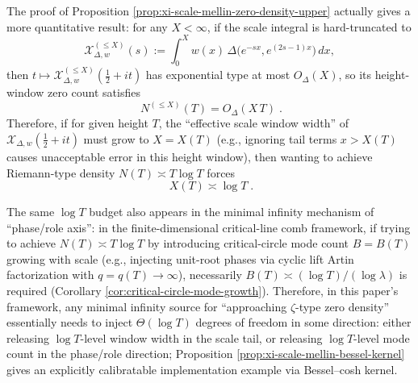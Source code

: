 \begin{remark}\label{rem:xi-scale-mellin-logT-budget}
The proof of Proposition \ref{prop:xi-scale-mellin-zero-density-upper} actually gives a more quantitative result: for any \(X<\infty\), if the scale integral is hard-truncated to
\[
\mathcal X_{\Delta,w}^{(\le X)}(s):=\int_{0}^{X} w(x)\,\Delta\!\bigl(e^{-sx},e^{(2s-1)x}\bigr)\,dx,
\]
then \(t\mapsto \mathcal X_{\Delta,w}^{(\le X)}(\tfrac12+it)\) has exponential type at most \(O_\Delta(X)\), so its height-window zero count satisfies
\[
\boxed{\;N^{(\le X)}(T)=O_\Delta(X\,T)\; }.
\]
Therefore, if for given height \(T\), the ``effective scale window width'' of \(\mathcal X_{\Delta,w}(\tfrac12+it)\) must grow to \(X=X(T)\) (e.g., ignoring tail terms \(x>X(T)\) causes unacceptable error in this height window), then wanting to achieve Riemann-type density \(N(T)\asymp T\log T\) forces
\[
\boxed{\;X(T)\asymp \log T\; }.
\]
\par
The same \(\log T\) budget also appears in the minimal infinity mechanism of ``phase/role axis'': in the finite-dimensional critical-line comb framework, if trying to achieve \(N(T)\asymp T\log T\) by introducing critical-circle mode count \(B=B(T)\) growing with scale (e.g., injecting unit-root phases via cyclic lift Artin factorization with \(q=q(T)\to\infty\)), necessarily \(B(T)\asymp (\log T)/(\log\lambda)\) is required (Corollary \ref{cor:critical-circle-mode-growth}).
Therefore, in this paper's framework, any minimal infinity source for ``approaching \(\zeta\)-type zero density'' essentially needs to inject \(\Theta(\log T)\) degrees of freedom in some direction: either releasing \(\log T\)-level window width in the scale tail, or releasing \(\log T\)-level mode count in the phase/role direction; Proposition \ref{prop:xi-scale-mellin-bessel-kernel} gives an explicitly calibratable implementation example via Bessel--cosh kernel.
\end{remark}

